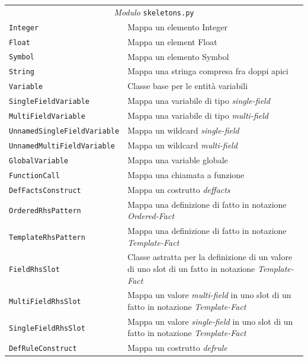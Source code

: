 \begin{longtable}{p{5.5cm}p{6.5cm}}
\multicolumn{2}{c}{\emph{Modulo} \texttt{skeletons.py}}\\
	\hdashline[5pt/5pt]
		\texttt{Integer} & Mappa un elemento Integer\\
	\hdashline[1pt/5pt]
		\texttt{Float} & Mappa un element Float\\ 
	\hdashline[1pt/5pt]
		\texttt{Symbol} & Mappa un elemento Symbol\\ 
	\hdashline[1pt/5pt]
		\texttt{String} & Mappa una stringa compresa fra doppi apici\\ 
	\hdashline[1pt/5pt]
		\texttt{Variable} & Classe base per le entità variabili\\ 	
	\hdashline[1pt/5pt]
		\texttt{SingleFieldVariable} & Mappa una variabile di tipo \emph{single-field}\\ 
	\hdashline[1pt/5pt]
		\texttt{MultiFieldVariable} & Mappa una variabile di tipo \emph{multi-field}\\ 
	\hdashline[1pt/5pt]
		\texttt{UnnamedSingleFieldVariable} & Mappa un wildcard \emph{single-field}\\
	\hdashline[1pt/5pt]
		\texttt{UnnamedMultiFieldVariable} & Mappa un wildcard \emph{multi-field}\\ 
	\hdashline[1pt/5pt]
		\texttt{GlobalVariable} & Mappa una variable globale\\ 
	\hdashline[1pt/5pt]
		\texttt{FunctionCall} & Mappa una chiamata a funzione\\
	\hdashline[1pt/5pt]
		\texttt{DefFactsConstruct} & Mappa un costrutto \emph{deffacts}\\
	\hdashline[1pt/5pt]
		\texttt{OrderedRhsPattern} & Mappa una definizione di fatto in notazione \emph{Ordered-Fact}\\ 
	\hdashline[1pt/5pt]
		\texttt{TemplateRhsPattern} & Mappa una definizione di fatto in notazione \emph{Template-Fact}\\ 
	\hdashline[1pt/5pt]
		\texttt{FieldRhsSlot} & Classe astratta per la definizione di un valore di uno slot di un fatto in notazione \emph{Template-Fact} \\ 
	\hdashline[1pt/5pt]
		\texttt{MultiFieldRhsSlot} & Mappa un valore \emph{multi-field} in uno slot di un fatto in notazione \emph{Template-Fact} \\ 
	\hdashline[1pt/5pt]
		\texttt{SingleFieldRhsSlot} & Mappa un valore \emph{single-field} in uno slot di un fatto in notazione \emph{Template-Fact} \\ 
	\hdashline[1pt/5pt]
		\texttt{DefRuleConstruct} & Mappa un costrutto \emph{defrule}\\ 

\end{longtable}
